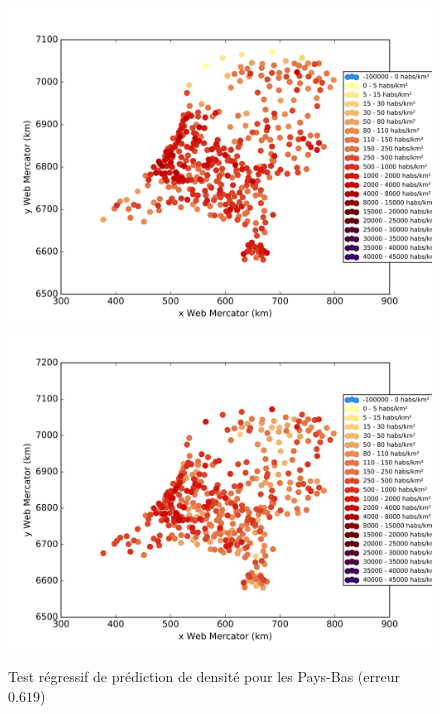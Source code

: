 \documentclass{book}
\begin{document}
\begin{figure}[H]
\begin{center}
\includegraphics[scale=0.5]{images/pays-bas_ground_truth.png}
\includegraphics[scale=0.5]{images/pays-bas_Random_Forest_Regression.png}
\end{center}
\caption{Test régressif de prédiction de densité pour les Pays-Bas (erreur $0.619$)}
\label{test_pays-bas}
\end{figure}
\clearpage
\end{document}
